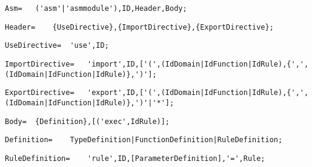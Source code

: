 \documentclass{article}
\begin{document}
    \begin{flushleft}
    \begin{lstlisting}[mathescape=true, breaklines=true]
     Asm= 	('asm'|'asmmodule'),ID,Header,Body;
    \end{lstlisting}
    \end{flushleft}
    \begin{flushleft}
    \begin{lstlisting}[mathescape=true, breaklines=true]
     Header= 	{UseDirective},{ImportDirective},{ExportDirective};
    \end{lstlisting}
    \end{flushleft}
    \begin{flushleft}
    \begin{lstlisting}[mathescape=true, breaklines=true]
     UseDirective= 	'use',ID;
    \end{lstlisting}
    \end{flushleft}
    \begin{flushleft}
    \begin{lstlisting}[mathescape=true, breaklines=true]
     ImportDirective= 	'import',ID,['(',(IdDomain|IdFunction|IdRule),{',',(IdDomain|IdFunction|IdRule)},')'];
    \end{lstlisting}
    \end{flushleft}
    \begin{flushleft}
    \begin{lstlisting}[mathescape=true, breaklines=true]
     ExportDirective= 	'export',ID,['(',(IdDomain|IdFunction|IdRule),{',',(IdDomain|IdFunction|IdRule)},')'|'*'];
    \end{lstlisting}
    \end{flushleft}
    \begin{flushleft}
    \begin{lstlisting}[mathescape=true, breaklines=true]
     Body= 	{Definition},[('exec',IdRule)];
    \end{lstlisting}
    \end{flushleft}
    \begin{flushleft}
    \begin{lstlisting}[mathescape=true, breaklines=true]
     Definition= 	TypeDefinition|FunctionDefinition|RuleDefinition;
    \end{lstlisting}
    \end{flushleft}
    \begin{flushleft}
    \begin{lstlisting}[mathescape=true, breaklines=true]
     RuleDefinition= 	'rule',ID,[ParameterDefinition],'=',Rule;
    \end{lstlisting}
    \end{flushleft}
\end{document}
